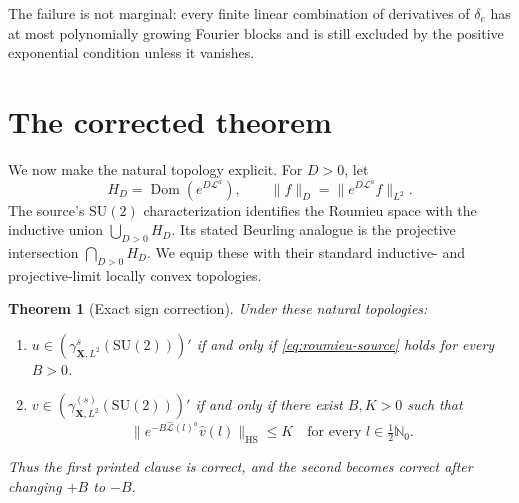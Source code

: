 \documentclass[11pt]{article}
\newtheorem{theorem}{Theorem}
\newcommand{\SU}{\mathrm{SU}(2)}
\newcommand{\cL}{\mathcal L}
\newcommand{\HS}{\mathrm{HS}}
\newcommand{\N}{\mathbb N}
\begin{document}
The failure is not marginal: every finite linear combination of derivatives
of \(\delta_e\) has at most polynomially growing Fourier blocks and is still
excluded by the positive exponential condition unless it vanishes.

\section{The corrected theorem}

We now make the natural topology explicit.  For \(D>0\), let
\[
 H_D=\operatorname{Dom}(e^{D\cL^a}),\qquad
 \|f\|_D=\|e^{D\cL^a}f\|_{L^2}.
\]
The source's \(\SU\) characterization identifies the Roumieu space with the
inductive union \(\bigcup_{D>0}H_D\).  Its stated Beurling analogue is the
projective intersection \(\bigcap_{D>0}H_D\).  We equip these with their
standard inductive- and projective-limit locally convex topologies.

\begin{theorem}[Exact sign correction]\label{thm:corrected}
Under these natural topologies:
\begin{enumerate}
 \item \(u\in(\gamma^s_{\mathbf X,L^2}(\SU))'\) if and only if
 \eqref{eq:roumieu-source} holds for every \(B>0\).
 \item \(v\in(\gamma^{(s)}_{\mathbf X,L^2}(\SU))'\) if and only if there
 exist \(B,K>0\) such that
 \begin{equation}\label{eq:correct}
  \|e^{-B\widehat{\cL}(l)^a}\widehat v(l)\|_{\HS}\le K
  \quad\text{for every }l\in\tfrac12\N_0.
 \end{equation}
\end{enumerate}
Thus the first printed clause is correct, and the second becomes correct
after changing \(+B\) to \(-B\).
\end{theorem}
\end{document}
